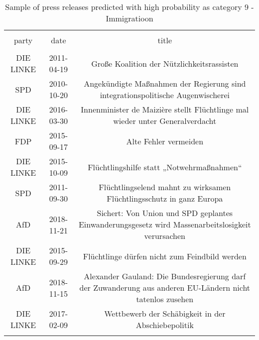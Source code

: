 
\begin{table}[!htbp] \centering 
  \caption{Sample of press releases predicted with high probability as category 9 - Immigratioon} 
  \label{tab:7-document-samples} 
\begin{tabular}{@{\extracolsep{5pt}} ccc} 
\\[-1.8ex]\hline 
\hline \\[-1.8ex] 
party & date & title \\ 
\hline \\[-1.8ex] 
DIE LINKE & 2011-04-19 & Große Koalition der Nützlichkeitsrassisten \\ 
SPD & 2010-10-20 & Angekündigte Maßnahmen der Regierung sind integrationspolitische Augenwischerei \\ 
DIE LINKE & 2016-03-30 & Innenminister de Maizière stellt Flüchtlinge mal wieder unter Generalverdacht \\ 
FDP & 2015-09-17 & Alte Fehler vermeiden \\ 
DIE LINKE & 2015-10-09 & Flüchtlingshilfe statt „Notwehrmaßnahmen“ \\ 
SPD & 2011-09-30 & Flüchtlingselend mahnt zu wirksamen Flüchtlingsschutz in ganz Europa \\ 
AfD & 2018-11-21 & Sichert: Von Union und SPD geplantes Einwanderungsgesetz wird Massenarbeitslosigkeit verursachen \\ 
DIE LINKE & 2015-09-29 & Flüchtlinge dürfen nicht zum Feindbild werden \\ 
AfD & 2018-11-15 & Alexander Gauland: Die Bundesregierung darf der Zuwanderung aus anderen EU-Ländern nicht tatenlos zusehen \\ 
DIE LINKE & 2017-02-09 & Wettbewerb der Schäbigkeit in der Abschiebepolitik \\ 
\hline \\[-1.8ex] 
\end{tabular} 
\end{table} 
